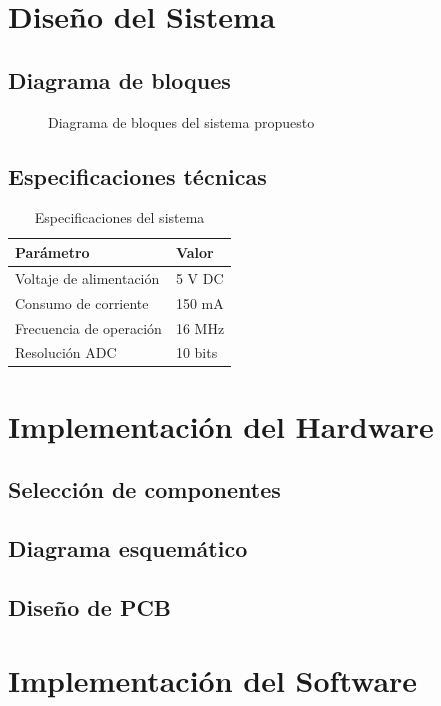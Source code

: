 \documentclass[12pt, letterpaper, oneside]{book}
\begin{document}
\section{Diseño del Sistema}
\subsection{Diagrama de bloques}
\begin{figure}[H]
    \centering
    \caption{Diagrama de bloques del sistema propuesto}
    \label{fig:bloques}
\end{figure}

\subsection{Especificaciones técnicas}
\begin{table}[H]
    \centering
    \caption{Especificaciones del sistema}
    \begin{tabular}{@{}ll@{}}
        \toprule
        \textbf{Parámetro} & \textbf{Valor} \\
        \midrule
        Voltaje de alimentación & 5 V DC \\
        Consumo de corriente & 150 mA \\
        Frecuencia de operación & 16 MHz \\
        Resolución ADC & 10 bits \\
        \bottomrule
    \end{tabular}
    \label{tab:especificaciones}
\end{table}

\section{Implementación del Hardware}
\subsection{Selección de componentes}
\subsection{Diagrama esquemático}
\subsection{Diseño de PCB}

\section{Implementación del Software}
\end{document}
